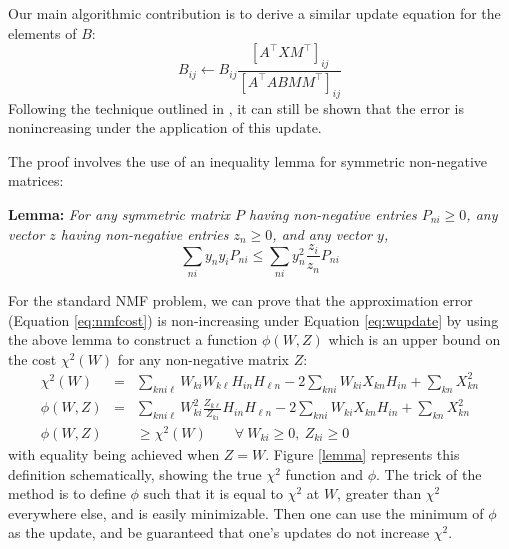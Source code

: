 \documentclass[12pt,preprint]{aastex}
\newcommand{\T}{^{\scriptscriptstyle \top}}
\newcommand{\XX}{X}
\newcommand{\Xkn}{X_{kn}}
\renewcommand{\AA}{A}
\newcommand{\WW}{W}
\newcommand{\Wki}{W_{ki}}
\newcommand{\Wkl}{W_{k\ell}}
\newcommand{\Hin}{H_{in}}
\newcommand{\Hln}{H_{\ell{}n}}
\newcommand{\BB}{B}
\newcommand{\MM}{M}
\newcommand{\Bij}{B_{ij}}
\newcommand{\PP}{P}
\newcommand{\Pni}{P_{ni}}
\newcommand{\ZZ}{Z}
\newcommand{\Zki}{Z_{ki}}
\newcommand{\Zkl}{Z_{k\ell}}
\newcommand{\zz}{z}
\newcommand{\yy}{y}
\newcommand{\yn}{y_n}
\newcommand{\yi}{y_i}
\newcommand{\zn}{z_n}
\newcommand{\zi}{z_i}
\begin{document}
Our main algorithmic contribution is to derive a similar update equation
for the elements of $\BB$:
\begin{equation} \label{eq:bupdate}
\Bij \leftarrow \Bij
\frac{[\AA\T\XX\MM\T]_{ij}}{[\AA\T\AA\BB\MM\MM\T]_{ij}}
\end{equation}
Following the technique outlined in \cite{lee00a}, it can still be shown
that the error is nonincreasing under the application of this update.

The proof involves the use of an inequality lemma for symmetric
non-negative matrices:

{\bf Lemma:} 
{\it For any symmetric matrix $\PP$ having non-negative entries $\Pni
\geq 0$, any vector $\zz$ having non-negative entries $\zn \geq 0$,
and any vector $\yy$,}
\begin{equation}
\sum_{ni} \yn \yi \Pni \leq \sum_{ni} \yn^2 \frac{\zi}{\zn} \Pni 
\end{equation}

For the standard NMF problem, we can prove that the approximation
error (Equation \ref{eq:nmfcost}) is non-increasing under Equation
\ref{eq:wupdate} by using the above lemma to construct a function
$\phi(\WW,\ZZ)$ which is an upper bound on the cost $\chi^2(\WW)$ for
any non-negative matrix $\ZZ$: {\small
\begin{eqnarray} 
\chi^2(\WW) &=& \sum_{kni\ell} \Wki\Wkl \Hin\Hln
- 2 \sum_{kni} \Wki \Xkn \Hin + \sum_{kn} \Xkn^2 \\
\phi(\WW,\ZZ) &=& \sum_{kni\ell} \Wki^2\frac{\Zkl}{\Zki} \Hin\Hln 
- 2 \sum_{kni} \Wki \Xkn \Hin + \sum_{kn} \Xkn^2 \\
\phi(\WW,\ZZ) 
&&\geq \chi^2(\WW) \qquad \forall \: \Wki\geq 0,\: \Zki\geq 0
\end{eqnarray}
} with equality being achieved when $\ZZ=\WW$. Figure \ref{lemma}
represents this definition schematically, showing the true $\chi^2$
function and $\phi$. The trick of the method is to define $\phi$ such
that it is equal to $\chi^2$ at $W$, greater than $\chi^2$ everywhere
else, and is easily minimizable. Then one can use the minimum of
$\phi$ as the update, and be guaranteed that one's updates do not
increase $\chi^2$.
\end{document}
